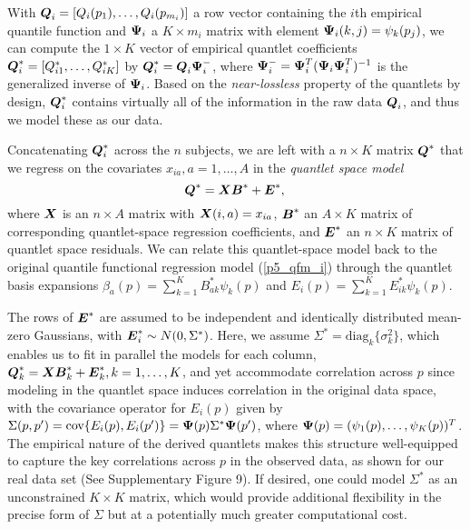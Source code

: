 \documentclass[11pt]{article}
\newcommand{\bB}{\mbox{\boldmath $B$}}
\newcommand{\bX}{\mbox{\boldmath $X$}}
\newcommand{\bE}{\mbox{\boldmath $E$}}
\newcommand{\bQ}{\mbox{\boldmath $Q$}}
\newcommand{\bzero}{\boldmath 0}
\newcommand{\bPsi}{\mbox{\boldmath $\Psi$}}
\begin{document}
 With $\bQ_i=[Q_i(p_1), \dots, Q_i(p_{m_i}) ]$ a row vector containing the $i$th empirical quantile function and $\bPsi_i$ a $K \times m_i$ matrix with element $\bPsi_i(k,j)=\psi_k(p_j)$, we can compute the $1 \times K$ vector of empirical quantlet coefficients $\bQ^*_i=[Q^*_{i1}, \ldots, Q^*_{iK}]$ by $\bQ^*_i = \bQ_i \bPsi_i^-$, where $\bPsi_i^-=\bPsi_i^T (\bPsi_i \bPsi_i^T)^{-1}$ is the generalized inverse of $\bPsi_i$.  %
 Based on the \textit{near-lossless} property of the quantlets by design, $\bQ^*_i$ contains virtually all of the information in the raw data $\bQ_i$, and thus we model these as our data.

Concatenating $\bQ^*_i$ across the $n$ subjects, we are left with a $n \times K$ matrix $\bQ^*$ that we regress on the covariates $x_{ia}, a=1,\ldots, A$ in the \textit{quantlet space model}
\vspace{-2mm}
\begin{equation}
\bQ^*=\bX \bB^* + \bE^*, \\ \label{eq:quantreg}
\end{equation}
where $\bX$ is an $n \times A$ matrix with $\bX(i,a)=x_{ia}$, $\bB^*$ an $A \times K$ matrix of corresponding quantlet-space regression coefficients, and $\bE^*$ an $n \times K$ matrix of quantlet space residuals.  We can relate this quantlet-space model back to the original quantile functional regression model (\ref{p5_qfm_i}) through the quantlet basis expansions $\beta_a(p)=\sum_{k=1}^K B^*_{ak} \psi_k(p)$ and $E_i(p)=\sum_{k=1}^K E^*_{ik} \psi_k(p)$.

The rows of $\bE^*$ are assumed to be independent and identically distributed mean-zero Gaussians, with $\bE^*_i \sim N(\bzero, \Sigma^*)$.  Here, we assume $\Sigma^*=\text{diag}_k\{\sigma^2_k\}$, which enables us to fit in parallel the models for each column, $\bQ^*_k = \bX \bB^*_k + \bE^*_k, k=1,\ldots,K$, and yet accommodate correlation across $p$ since modeling in the quantlet space induces correlation in the original data space, with the covariance operator for $E_i(p)$ given by $\Sigma(p,p')=\text{cov}\{E_i(p), E_i(p')\} = \bPsi(p) \Sigma^* \bPsi(p')$, where $\bPsi(p)=(\psi_1(p), \ldots, \psi_K(p))^T$.     The empirical nature of the derived quantlets makes this structure well-equipped to capture the key correlations across $p$ in the observed data, as shown for our %
real data set (See Supplementary Figure 9).
If desired, %
one could model $\Sigma^*$ as an unconstrained $K \times K$ matrix, which would provide additional flexibility in the precise form of $\Sigma$ but at a potentially much greater computational cost.
\end{document}
